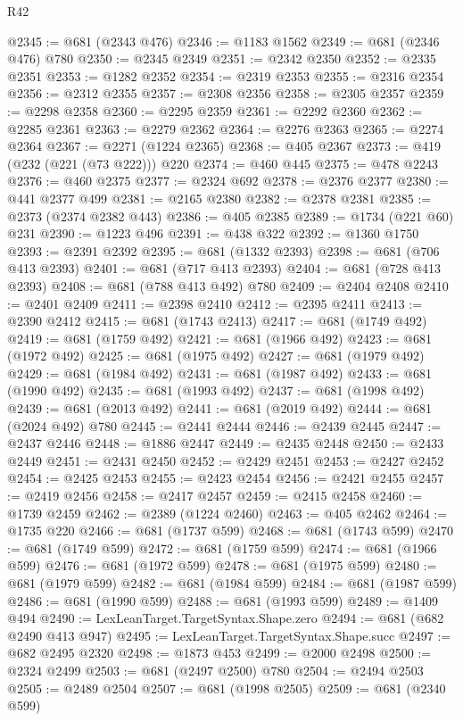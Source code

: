 \begin{lexlean}{R42}
\begin{coremodule}
@2345 := @681 (@2343 @476)
@2346 := @1183 @1562
@2349 := @681 (@2346 @476) @780
@2350 := @2345 @2349
@2351 := @2342 @2350
@2352 := @2335 @2351
@2353 := @1282 @2352
@2354 := @2319 @2353
@2355 := @2316 @2354
@2356 := @2312 @2355
@2357 := @2308 @2356
@2358 := @2305 @2357
@2359 := @2298 @2358
@2360 := @2295 @2359
@2361 := @2292 @2360
@2362 := @2285 @2361
@2363 := @2279 @2362
@2364 := @2276 @2363
@2365 := @2274 @2364
@2367 := @2271 (@1224 @2365)
@2368 := @405 @2367
@2373 := @419 (@232 (@221 (@73 @222))) @220
@2374 := @460 @445
@2375 := @478 @2243
@2376 := @460 @2375
@2377 := @2324 @692
@2378 := @2376 @2377
@2380 := @441 @2377 @499
@2381 := @2165 @2380
@2382 := @2378 @2381
@2385 := @2373 (@2374 @2382 @443)
@2386 := @405 @2385
@2389 := @1734 (@221 @60) @231
@2390 := @1223 @496
@2391 := @438 @322
@2392 := @1360 @1750
@2393 := @2391 @2392
@2395 := @681 (@1332 @2393)
@2398 := @681 (@706 @413 @2393)
@2401 := @681 (@717 @413 @2393)
@2404 := @681 (@728 @413 @2393)
@2408 := @681 (@788 @413 @492) @780
@2409 := @2404 @2408
@2410 := @2401 @2409
@2411 := @2398 @2410
@2412 := @2395 @2411
@2413 := @2390 @2412
@2415 := @681 (@1743 @2413)
@2417 := @681 (@1749 @492)
@2419 := @681 (@1759 @492)
@2421 := @681 (@1966 @492)
@2423 := @681 (@1972 @492)
@2425 := @681 (@1975 @492)
@2427 := @681 (@1979 @492)
@2429 := @681 (@1984 @492)
@2431 := @681 (@1987 @492)
@2433 := @681 (@1990 @492)
@2435 := @681 (@1993 @492)
@2437 := @681 (@1998 @492)
@2439 := @681 (@2013 @492)
@2441 := @681 (@2019 @492)
@2444 := @681 (@2024 @492) @780
@2445 := @2441 @2444
@2446 := @2439 @2445
@2447 := @2437 @2446
@2448 := @1886 @2447
@2449 := @2435 @2448
@2450 := @2433 @2449
@2451 := @2431 @2450
@2452 := @2429 @2451
@2453 := @2427 @2452
@2454 := @2425 @2453
@2455 := @2423 @2454
@2456 := @2421 @2455
@2457 := @2419 @2456
@2458 := @2417 @2457
@2459 := @2415 @2458
@2460 := @1739 @2459
@2462 := @2389 (@1224 @2460)
@2463 := @405 @2462
@2464 := @1735 @220
@2466 := @681 (@1737 @599)
@2468 := @681 (@1743 @599)
@2470 := @681 (@1749 @599)
@2472 := @681 (@1759 @599)
@2474 := @681 (@1966 @599)
@2476 := @681 (@1972 @599)
@2478 := @681 (@1975 @599)
@2480 := @681 (@1979 @599)
@2482 := @681 (@1984 @599)
@2484 := @681 (@1987 @599)
@2486 := @681 (@1990 @599)
@2488 := @681 (@1993 @599)
@2489 := @1409 @494
@2490 := LexLeanTarget.TargetSyntax.Shape.zero
@2494 := @681 (@682 @2490 @413 @947)
@2495 := LexLeanTarget.TargetSyntax.Shape.succ
@2497 := @682 @2495 @2320
@2498 := @1873 @453
@2499 := @2000 @2498
@2500 := @2324 @2499
@2503 := @681 (@2497 @2500) @780
@2504 := @2494 @2503
@2505 := @2489 @2504
@2507 := @681 (@1998 @2505)
@2509 := @681 (@2340 @599)

\end{coremodule}
\end{lexlean}
